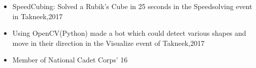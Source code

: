 \vspace{-0.2cm}


{\fontsize{11pt}{1em}\bodyfontlight\upshape\color{text}
\begin{itemize}
  \itemsep-0.3em
  \item SpeedCubing: Solved a Rubik’s Cube in 25 seconds in the Speedsolving event in Takneek,2017
  \item Using OpenCV(Python) made a bot which could detect various shapes and move in their direction in the Visualize event of Takneek,2017
  \item Member of National Cadet Corps’ 16
\end{itemize}
}

